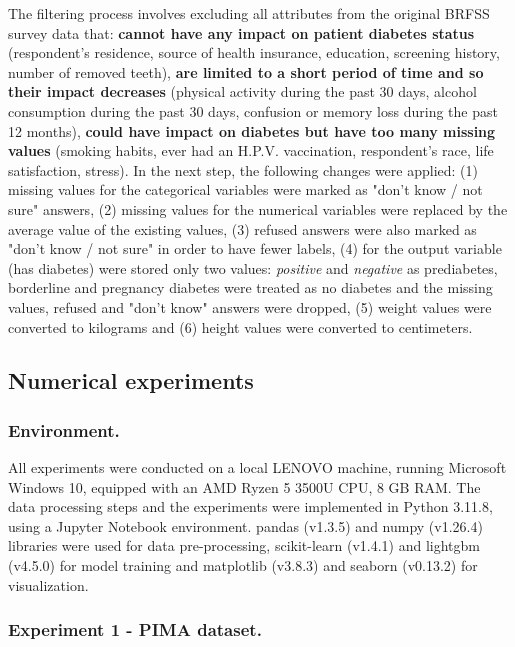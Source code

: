 \documentclass[runningheads]{llncs}
\begin{document}
The filtering process involves excluding all attributes from the original BRFSS survey data that:
\textbf{cannot have any impact on patient diabetes status} (respondent's residence, source of health insurance, education, screening history, number of removed teeth), 
\textbf{are limited to a short period of time and so their impact decreases} (physical activity during the past 30 days, alcohol consumption during the past 30 days, confusion or memory loss during the past 12 months), 
\textbf{could have impact on diabetes but have too many missing values} (smoking habits, ever had an H.P.V. vaccination, respondent's race, life satisfaction, stress). 
In the next step, the following changes were applied: 
(1) missing values for the  categorical variables  were marked as "don't know / not sure" answers, 
(2) missing values for the numerical variables were replaced by the average value of the existing values, 
(3) refused answers were also marked as "don't know / not sure" in order to have fewer labels, 
(4) for the output variable (has diabetes) were stored only two values: \textit{positive} and \textit{negative} as prediabetes, borderline and pregnancy diabetes were treated as no diabetes and the missing values, refused and "don't know" answers were dropped, 
(5) weight values were converted to kilograms and 
(6) height values were converted to centimeters.


\subsection{Numerical experiments}

\subsubsection{Environment.}
All experiments were conducted on a local LENOVO machine, running Microsoft Windows 10, equipped with an AMD Ryzen 5 3500U CPU, 8 GB RAM. The data processing steps and the experiments were implemented in Python 3.11.8, using a Jupyter Notebook environment. pandas (v1.3.5) and numpy (v1.26.4) libraries were used for data pre-processing, 
scikit-learn (v1.4.1) and lightgbm (v4.5.0) for model training and
matplotlib (v3.8.3) and seaborn (v0.13.2) for visualization.

\subsubsection{Experiment 1 - PIMA dataset.}
\end{document}

